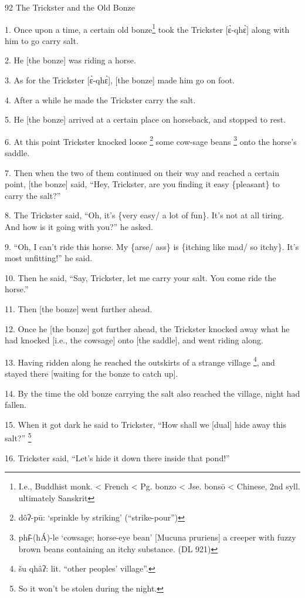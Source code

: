 
92 The Trickster and the Old Bonze

1. Once upon a time, a certain old bonze\footnote{I.e., Buddhist monk. < French < Pg. bonzo < Jse. bonsō < Chinese, 2nd syll. ultimately Sanskrit} took the Trickster [ɛ̀-qhɛ̀] along
with him to go carry salt.

2. He [the bonze] was riding a horse.

3. As for the Trickster [ɛ̀-qhɛ̀], [the bonze] made him go on foot.

4. After a while he made the Trickster carry the salt.

5. He [the bonze] arrived at a certain place on horseback, and stopped to rest.

6. At this point Trickster knocked loose \footnote{dôʔ-pū: `sprinkle by striking' (``strike-pour'')} some cow-sage beans \footnote{phɨ̂-(hÁ)-le `cowsage; horse-eye bean' [Mucuna pruriens] a creeper with fuzzy brown beans containing an itchy substance. (DL 921)} onto the horse's
saddle.

7. Then when the two of them continued on their way and reached a certain point,
[the bonze] said, ``Hey, Trickster, are you finding it easy \{pleasant\} to carry
the salt?''

8. The Trickster said, ``Oh, it's \{very easy/ a lot of fun\}. It's not at all
tiring. And how is it going with you?'' he asked.

9. ``Oh, I can't ride this horse. My \{arse/ ass\} is \{itching like mad/ so itchy\}.
It's most unfitting!'' he said.

10. Then he said, ``Say, Trickster, let me carry your salt. You come ride the horse.''

11. Then [the bonze] went further ahead.

12. Once he [the bonze] got further ahead, the Trickster knocked away what he had
knocked [i.e., the cowsage] onto [the saddle], and went riding along.

13. Having ridden along he reached the outskirts of a strange village \footnote{šu qhâʔ: lit. ``other peoples' village''.}, and
stayed there [waiting for the bonze to catch up].

14. By the time the old bonze carrying the salt also reached the village, night
had fallen.

15. When it got dark he said to Trickster, ``How shall we [dual] hide away this
salt?'' \footnote{So it won't be stolen during the night.}

16. Trickster said, ``Let's hide it down there inside that pond!''

